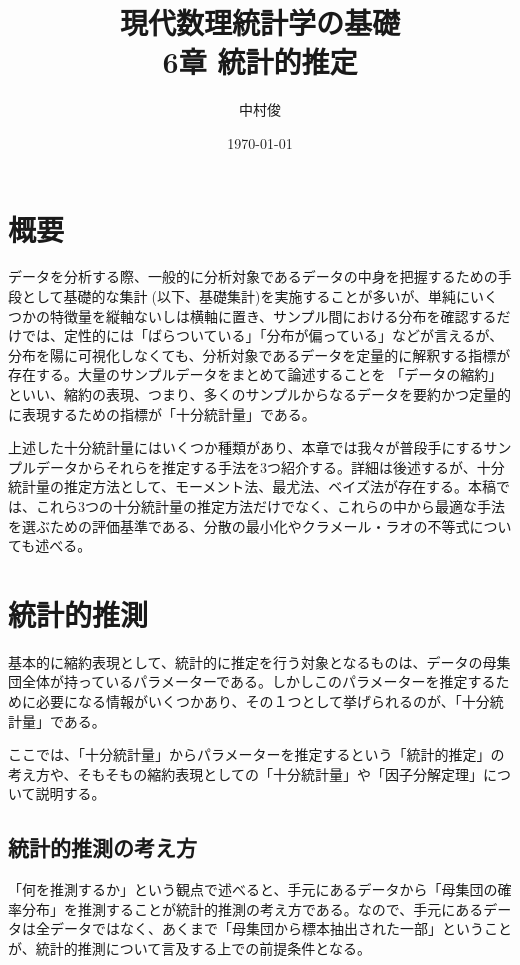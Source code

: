 \documentclass[a4paper,dvipdfmx]{jsarticle}
\begin{document}
\title{現代数理統計学の基礎 \\ 6章 統計的推定}
\author{中村俊}
\date{\today}
\maketitle
\setcounter{section}{-1}

\section{概要}
データを分析する際、一般的に分析対象であるデータの中身を把握するための手段として基礎的な集計(以下、基礎集計)を実施することが多いが、単純にいくつかの特徴量を縦軸ないしは横軸に置き、サンプル間における分布を確認するだけでは、定性的には「ばらついている」「分布が偏っている」などが言えるが、分布を陽に可視化しなくても、分析対象であるデータを定量的に解釈する指標が存在する。大量のサンプルデータをまとめて論述することを
「データの縮約」といい、縮約の表現、つまり、多くのサンプルからなるデータを要約かつ定量的に表現するための指標が「十分統計量」である。

上述した十分統計量にはいくつか種類があり、本章では我々が普段手にするサンプルデータからそれらを推定する手法を3つ紹介する。詳細は後述するが、十分統計量の推定方法として、モーメント法、最尤法、ベイズ法が存在する。本稿では、これら3つの十分統計量の推定方法だけでなく、これらの中から最適な手法を選ぶための評価基準である、分散の最小化やクラメール・ラオの不等式についても述べる。



\section{統計的推測}
基本的に縮約表現として、統計的に推定を行う対象となるものは、データの母集団全体が持っているパラメーターである。しかしこのパラメーターを推定するために必要になる情報がいくつかあり、その１つとして挙げられるのが、「十分統計量」である。

ここでは、「十分統計量」からパラメーターを推定するという「統計的推定」の考え方や、そもそもの縮約表現としての「十分統計量」や「因子分解定理」について説明する。

\subsection{統計的推測の考え方}
「何を推測するか」という観点で述べると、手元にあるデータから「母集団の確率分布」を推測することが統計的推測の考え方である。なので、手元にあるデータは全データではなく、あくまで「母集団から標本抽出された一部」ということが、統計的推測について言及する上での前提条件となる。
\end{document}

